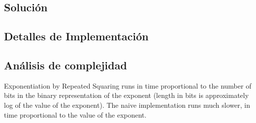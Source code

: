 \subsection*{Solución}

\subsection*{Detalles de Implementación}

\subsection*{Análisis de complejidad}

Exponentiation by Repeated Squaring runs in time proportional to the number of
bits in the binary representation of the exponent (length in bits is
approximately log of the value of the exponent). The naive implementation runs
much slower, in time proportional to the value of the exponent.